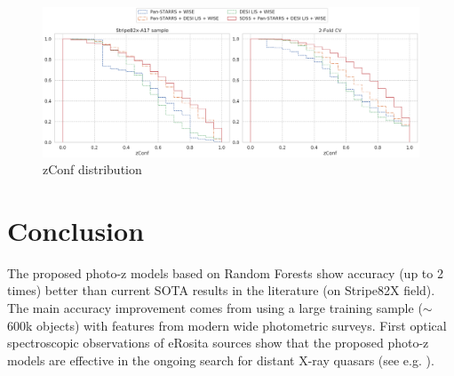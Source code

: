 \documentclass[fleqn,usenatbib]{mnras}
\begin{document}
\begin{figure}
    \centering
    \includegraphics[width=0.9\linewidth]{images/zconf-cal.png}
    \caption{zConf distribution}
    \label{fig:zconf-cal-dr16q}
\end{figure}


\section{Conclusion}\label{sec:conclusion}



The proposed photo-z models based on Random Forests show accuracy (up to 2 times) better than current SOTA results in the literature (on Stripe82X field). The main accuracy improvement comes from using a large training sample ($\sim$600k objects) with features from modern wide photometric surveys. First optical spectroscopic observations of eRosita sources show that the proposed photo-z models are effective in the ongoing search for distant X-ray quasars (see e.g. \citep{2020MNRAS.497.1842M,2020AstL...46..149K,2020AstL...46..429D}).
\end{document}
